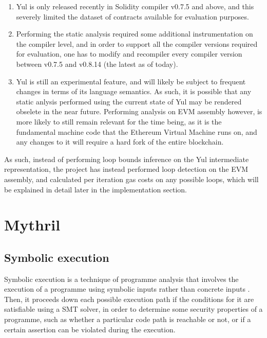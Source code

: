 \begin{enumerate}
    \item Yul is only released recently in Solidity compiler v0.7.5
    and above, and this severely limited the dataset of contracts available for evaluation
    purposes.

    \item Performing the static analysis required some additional instrumentation on the
    compiler level, and in order to support all the compiler versions required for evaluation,
    one has to modify and recompiler every compiler version between v0.7.5 and v0.8.14 (the latest
    as of today).

    \item Yul is still an experimental feature, and will likely be subject to frequent changes
    in terms of its language semantics. As such, it is possible that any static anlysis
    performed using the current state of Yul may be rendered obselete in the near future.
    Performing analysis on EVM assembly however, is more likely to still remain relevant for
    the time being, as it is the fundamental machine code that the Ethereum Virtual Machine runs on,
    and any changes to it will require a hard fork of the entire blockchain.
      
\end{enumerate}

As such, instead of performing loop bounds inference on the Yul intermediate representation,
the project has instead performed loop detection on the EVM assembly, and calculated per iteration
gas costs on any possible loops, which will be explained in detail later in the 
implementation section.

\section{Mythril}
\subsection{Symbolic execution}

Symbolic execution is a technique of programme analysis that involves the execution of a programme
using symbolic inputs rather than concrete inputs \cite{10.1145/360248.360252}. Then, it proceeds down
each possible execution path if the conditions for it are satisfiable using a SMT solver, in order to determine some security properties of 
a programme, such as whether a particular code path is reachable or not, or if a certain assertion can
be violated during the execution.

